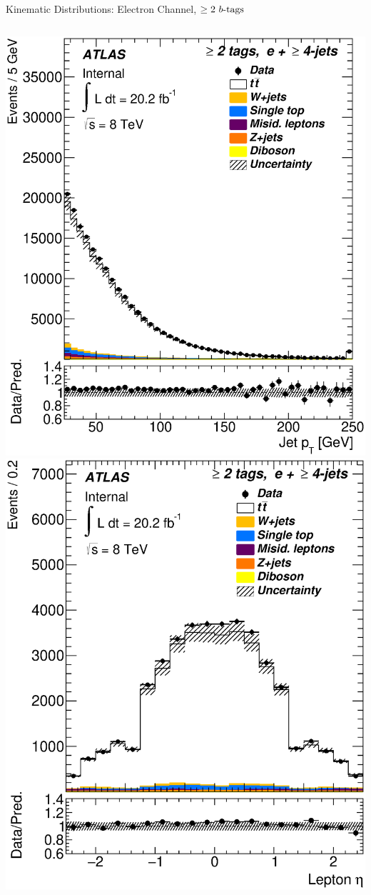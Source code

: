 \documentclass{beamer}
\begin{document}
{\begin{frame}{Kinematic Distributions: Electron Channel, $\geq2\text{ } \lowercase{ b\text{-tags}}$}
\begin{columns}
      \includegraphics[width=.95\textwidth]{../chapters/whel/figures/control_Plots2/bTag_2incl/JetPt_el}
      \includegraphics[width=.95\textwidth]{../chapters/whel/figures/control_Plots2/bTag_2incl/LeptonEta_el}\\

\end{columns}
\end{frame}}
\end{document}
